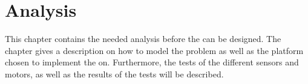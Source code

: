 \chapter{Analysis} \label{cha:analysis}

This chapter contains the needed analysis before the \projname{} can be designed. The chapter gives a description on how to model the problem as well as the platform chosen to implement the \projname{} on. Furthermore, the tests of the different sensors and motors, as well as the results of the tests will be described.










